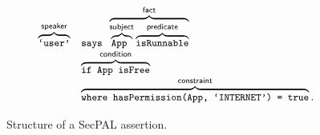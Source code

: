 \documentclass[thesis.tex]{subfiles}
\begin{document}
\begin{figure}
  \newcommand{\bracetext}[1]{\text{\sffamily #1}}
  \newcommand{\smalltext}[1]{\text{\ttfamily\small #1}}
  \centering
  \begin{equation*}
    \begin{array}{r l}
      \overbrace{\smalltext{`user'}}^{\bracetext{speaker}} &
                                                             \smalltext{ says }\overbrace{\overbrace{\smalltext{ App }}^{\bracetext{subject}}\overbrace{\smalltext{ isRunnable}}^{\bracetext{predicate}}}^{\bracetext{fact}} \\
                                                           & \overbrace{\smalltext{ if App isFree}}^{\bracetext{condition}} \\
                                                           & \overbrace{\smalltext{ where hasPermission(App, `INTERNET') = true}}^{\bracetext{constraint}}.
    \end{array}
  \end{equation*}
  \caption{Structure of a SecPAL assertion.}
  \label{fig:assertion}
\end{figure}
\end{document}
